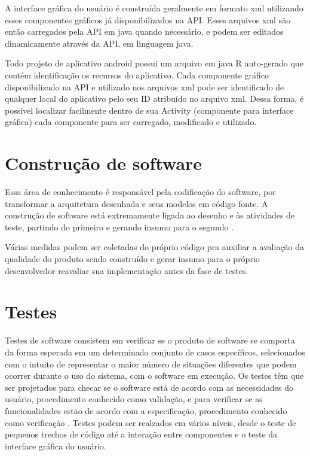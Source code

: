 A interface gráfica do usuário é construída geralmente em formato xml utilizando esses componentes gráficos já disponibilizados na API. Esses arquivos xml são então carregados pela API em java quando necessário, e podem ser editados dinamicamente através da API, em linguagem java.

Todo projeto de aplicativo android possui um arquivo em java R auto-gerado que contém identificação os recursos do aplicativo. Cada componente gráfico disponibilizado na API e utilizado nos arquivos xml pode ser identificado de qualquer local do aplicativo pelo seu ID atribuído no arquivo xml. Dessa forma, é possível localizar facilmente dentro de sua Activity (componente para interface gráfica) cada componente para ser carregado, modificado e utilizado.

\section{Construção de software}


Essa área de conhecimento é responsável pela codificação do software, por transformar a arquitetura desenhada e seus modelos em código fonte. A construção de software está extremamente ligada ao desenho e às atividades de teste, partindo do primeiro e gerando insumo para o segundo \cite{swebok}.

Várias medidas podem ser coletadas do próprio código pra auxiliar a avaliação da qualidade do produto sendo construído e gerar insumo para o próprio desenvolvedor reavaliar sua implementação antes da fase de testes.

\section{Testes}


Testes de software consistem em verificar se o produto de software se comporta da forma esperada em um determinado conjunto de casos específicos, selecionados com o intuito de representar o maior número de situações diferentes que podem ocorrer durante o uso do sistema, com o software em execução. Os testes têm que ser projetados para checar se o software está de acordo com as necessidades do usuário, procedimento conhecido como validação, e para verificar se as funcionalidades estão de acordo com a especificação, procedimento conhecido como verificação \cite{swebok}. Testes podem ser realzados em vários níveis, desde o teste de pequenos trechos de código até a interação entre componentes e o teste da interface gráfica do usuário.

